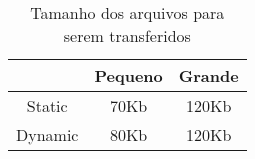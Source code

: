 \begin{table}[!h]
  \centering
  \begin{tabular}{|c|c|c|}
      \hline 
    & \textbf{Pequeno} & \textbf{Grande}\\
      \hline\hline
    Static & 70Kb & 120Kb\\
      \hline
    Dynamic & 80Kb & 120Kb \\
      \hline
  \end{tabular}

  \caption{Tamanho dos arquivos para serem transferidos}
  \label{tab:file_size}
\end{table}

